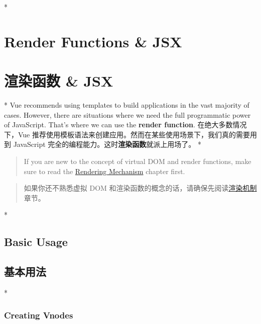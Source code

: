 
\begin{paracol}{2} 
 
\switchcolumn[0]*%
\section{Render Functions \& JSX}
\switchcolumn
\section{渲染函数 \& JSX}
\switchcolumn[0]*%
Vue recommends using templates to build applications in the vast
majority of cases. However, there are situations where we need the full
programmatic power of JavaScript. That's where we can use the
\textbf{render function}.
\switchcolumn
在绝大多数情况下，Vue
推荐使用模板语法来创建应用。然而在某些使用场景下，我们真的需要用到
JavaScript 完全的编程能力。这时\textbf{渲染函数}就派上用场了。
\switchcolumn[0]*%
\begin{quote}
If you are new to the concept of virtual DOM and render functions, make
sure to read the
\href{https://vuejs.org/guide/extras/rendering-mechanism.html}{Rendering
Mechanism} chapter first.
\end{quote}
\switchcolumn
\begin{quote}
如果你还不熟悉虚拟 DOM
和渲染函数的概念的话，请确保先阅读\href{https://cn.vuejs.org/guide/extras/rendering-mechanism.html}{渲染机制}章节。
\end{quote}
\switchcolumn[0]*%
\subsection{Basic Usage}
\switchcolumn
\subsection{基本用法}
\switchcolumn[0]*%
\subsubsection{Creating Vnodes}
\switchcolumn

\end{paracol}
